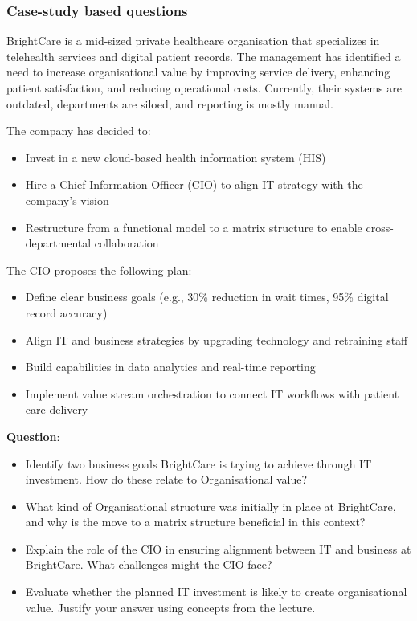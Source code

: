 \subsubsection{Case-study based questions}

\indent 

BrightCare is a mid-sized private healthcare organisation that specializes in telehealth services and digital patient records. The management has identified a need to increase organisational value by improving service delivery, enhancing patient satisfaction, and reducing operational costs. Currently, their systems are outdated, departments are siloed, and reporting is mostly manual.

The company has decided to:

\begin{itemize}
    \item Invest in a new cloud-based health information system (HIS)
    \item Hire a Chief Information Officer (CIO) to align IT strategy with the company’s vision
    \item Restructure from a functional model to a matrix structure to enable cross-departmental collaboration
\end{itemize}

The CIO proposes the following plan:

\begin{itemize}
    \item Define clear business goals (e.g., 30\% reduction in wait times, 95\% digital record accuracy)
    \item Align IT and business strategies by upgrading technology and retraining staff
    \item Build capabilities in data analytics and real-time reporting
    \item Implement value stream orchestration to connect IT workflows with patient care delivery
\end{itemize}

\noindent \textbf{Question}:

\begin{itemize}
    \item Identify two business goals BrightCare is trying to achieve through IT investment. How do these relate to Organisational value?
    \item What kind of Organisational structure was initially in place at BrightCare, and why is the move to a matrix structure beneficial in this context?
    \item Explain the role of the CIO in ensuring alignment between IT and business at BrightCare. What challenges might the CIO face?
    \item Evaluate whether the planned IT investment is likely to create organisational value. Justify your answer using concepts from the lecture.
\end{itemize}
